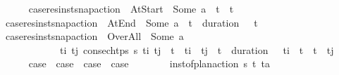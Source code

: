 \begin{isabellebody}
\ \ \ \ \isamarkupfalse%
\ {\isacharquery}{\kern0pt}case{}{\isacharequal}{\kern0pt}{\isachardoublequoteopen}res{\isacharunderscore}{\kern0pt}inst{\isacharunderscore}{\kern0pt}snap{\isacharunderscore}{\kern0pt}action\ {\isasympi}\ At{\isacharunderscore}{\kern0pt}Start\ {\isacharequal}{\kern0pt}\ Some\ a\ {\isasymand}\ t\isactrlsub {\isasympi}\ {\isacharequal}{\kern0pt}\ t{\isachardoublequoteclose}\isanewline
\ \ \ \ \isamarkupfalse%
\ {\isacharquery}{\kern0pt}case{}{\isacharequal}{\kern0pt}{\isachardoublequoteopen}res{\isacharunderscore}{\kern0pt}inst{\isacharunderscore}{\kern0pt}snap{\isacharunderscore}{\kern0pt}action\ {\isasympi}\ At{\isacharunderscore}{\kern0pt}End\ {\isacharequal}{\kern0pt}\ Some\ a\ {\isasymand}\ t\isactrlsub {\isasympi}\ {\isacharplus}{\kern0pt}\ duration\ {\isasympi}\ {\isacharequal}{\kern0pt}\ t{\isachardoublequoteclose}\isanewline
\ \ \ \ \isamarkupfalse%
\ {\isacharquery}{\kern0pt}case{}{\isacharequal}{\kern0pt}{\isachardoublequoteopen}res{\isacharunderscore}{\kern0pt}inst{\isacharunderscore}{\kern0pt}snap{\isacharunderscore}{\kern0pt}action\ {\isasympi}\ Over{\isacharunderscore}{\kern0pt}All\ {\isacharequal}{\kern0pt}\ Some\ a\ {\isasymand}\ \isanewline
\ \ \ \ \ \ \ \ \ \ \ \ {\isacharparenleft}{\kern0pt}{\isasymexists}t\isactrlsub i\ t\isactrlsub j{\isachardot}{\kern0pt}\ consec{\isacharunderscore}{\kern0pt}htps\ {\isasympi}s\ t\isactrlsub i\ t\isactrlsub j\ {\isasymand}\ t\isactrlsub {\isasympi}\ {\isasymle}\ t\isactrlsub i\ {\isasymand}\ t\isactrlsub j\ {\isasymle}\ t\isactrlsub {\isasympi}\ {\isacharplus}{\kern0pt}\ {\isacharparenleft}{\kern0pt}duration\ {\isasympi}{\isacharparenright}{\kern0pt}\ {\isasymand}\ t\isactrlsub i\ {\isacharless}{\kern0pt}\ t\ {\isasymand}\ t\ {\isacharless}{\kern0pt}\ t\isactrlsub j{\isacharparenright}{\kern0pt}{\isachardoublequoteclose}\isanewline
\ \ \ \ \isamarkupfalse%
\ {\isachardoublequoteopen}{\isacharquery}{\kern0pt}case{}\ {\isasymor}\ {\isacharquery}{\kern0pt}case{}\ {\isasymor}\ {\isacharquery}{\kern0pt}case{}\ {\isasymor}\ {\isacharquery}{\kern0pt}case{}{\isachardoublequoteclose}\isanewline
\ \ \ \ \ \ \isamarkupfalse%
\ {\isacartoucheopen}inst{\isacharunderscore}{\kern0pt}of{\isacharunderscore}{\kern0pt}plan{\isacharunderscore}{\kern0pt}action\ {\isasympi}s\ {\isacharparenleft}{\kern0pt}t\isactrlsub {\isasympi}{\isacharcomma}{\kern0pt}{\isasympi}{\isacharparenright}{\kern0pt}\ {\isacharparenleft}{\kern0pt}t{\isacharcomma}{\kern0pt}a{\isacharparenright}{\kern0pt}{\isacartoucheclose}\ \isamarkupfalse%

\end{isabellebody}
